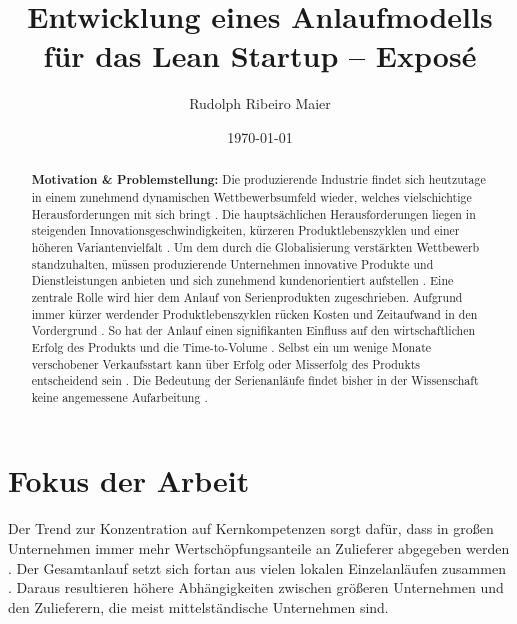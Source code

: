 \documentclass[%
a4paper,
aps,
pra,
 longbibliography,
 lengthcheck,%
]{revtex4-1}
\begin{document}

\title{Entwicklung eines Anlaufmodells für das Lean Startup -- Exposé}

\author{Rudolph Ribeiro Maier}


\date{\today}%

\begin{abstract}
\textbf{Motivation \& Problemstellung:}
Die produzierende Industrie findet sich heutzutage in einem zunehmend dynamischen Wettbewerbsumfeld wieder, welches vielschichtige Herausforderungen mit sich bringt \cite{Renner2012}. Die hauptsächlichen Herausforderungen liegen in steigenden Innovationsgeschwindigkeiten, kürzeren Produktlebenszyklen und einer höheren Variantenvielfalt \cite{Kuhn2002,Stauder2016}. Um dem durch die Globalisierung verstärkten Wettbewerb standzuhalten, müssen produzierende Unternehmen innovative Produkte und Dienstleistungen anbieten und sich zunehmend kundenorientiert aufstellen \cite{Surbier2014}. 
Eine zentrale Rolle wird hier dem Anlauf von Serienprodukten zugeschrieben. Aufgrund immer kürzer werdender Produktlebenszyklen rücken Kosten und Zeitaufwand in den Vordergrund \cite{Winkler2007}. So hat der Anlauf einen signifikanten Einfluss auf den wirtschaftlichen Erfolg des Produkts und die Time-to-Volume \cite{Klocke16}. Selbst ein um wenige Monate verschobener Verkaufsstart kann über Erfolg oder Misserfolg des Produkts entscheidend sein \cite{Schuh2008a}. Die Bedeutung der Serienanläufe findet bisher in der Wissenschaft keine angemessene Aufarbeitung \cite{Dyckhoff2012}. 
\end{abstract}

\maketitle


\section{Fokus der Arbeit}
Der Trend zur Konzentration auf Kernkompetenzen sorgt dafür, dass in großen Unternehmen immer mehr Wertschöpfungsanteile an Zulieferer abgegeben werden  \cite{Hilmola2015, Wildemann2008}. Der Gesamtanlauf setzt sich fortan aus vielen lokalen Einzelanläufen zusammen \cite{Zimolong2006}. Daraus resultieren höhere Abhängigkeiten zwischen größeren Unternehmen und den Zulieferern, die meist mittelständische Unternehmen sind. 
\end{document}
